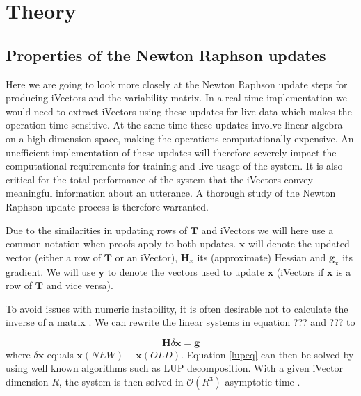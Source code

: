 \chapter{Theory}
\label{sect:Theory}

\section{Properties of the Newton Raphson updates}

Here we are going to look more closely at the Newton Raphson update steps for producing iVectors and the variability matrix. In a real-time implementation we would need to extract iVectors using these updates for live data which makes the operation time-sensitive. At the same time these updates involve linear algebra on a high-dimension space, making the operations computationally expensive. An unefficient implementation of these updates will therefore severely impact the computational requirements for training and live usage of the system. It is also critical for the total performance of the system that the iVectors convey meaningful information about an utterance. A thorough study of the Newton Raphson update process is therefore warranted. 

Due to the similarities in updating rows of $\mathbf{T}$ and iVectors we will here use a common notation when proofs apply to both updates. $\mathbf{x}$ will denote the updated vector (either a row of $\mathbf{T}$ or an iVector), $\mathbf{H}_x$ its (approximate) Hessian and $\mathbf{g}_x$ its gradient. We will use $\mathbf{y}$ to denote the vectors used to update $\mathbf{x}$ (iVectors if $\mathbf{x}$ is a row of $\mathbf{T}$ and vice versa).

To avoid issues with numeric instability, it is often desirable not to calculate the inverse of a matrix \cite[p. 743]{cormen}. We can rewrite the linear systems in equation ??? and ??? to

\begin{equation}\label{lupeq}
\mathbf{H}\delta\mathbf{x} = \mathbf{g}
\end{equation}
where $\delta\mathbf{x}$ equals $\mathbf{x}(NEW)-\mathbf{x}(OLD)$. Equation \ref{lupeq} can then be solved by using well known algorithms such as LUP decomposition. With a given iVector dimension $R$, the system is then solved in $\mathcal{O}(R^3)$ asymptotic time \cite[p. 754]{cormen}. 

